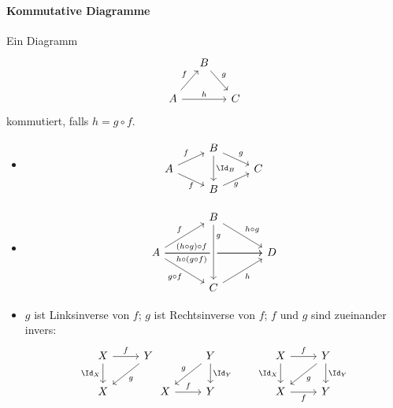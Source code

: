 \paragraph{Kommutative Diagramme}

Ein Diagramm
\[
	\begin{tikzcd}[column sep=small]
		& B \arrow{dr}{g} & \\
		A \arrow{ur}{f} \arrow{rr}{h} & & C
	\end{tikzcd}
\]
kommutiert, falls $h = g \circ f$.

\begin{ex}
	\begin{itemize}
		\item
			\[
				\begin{tikzcd}[row sep=tiny]
					& B \arrow{dr}{g} \arrow{dd}{\Id_B} & \\
					A \arrow{ur}{f} \arrow{dr}[below]{f} & & C \\
					& B \arrow{ur}[below]{g} &
				\end{tikzcd}
			\]
		\item
			\[
				\begin{tikzcd}[column sep=large]
					~& B \arrow{dr}{h\circ g} & \\
					A \arrow{ur}{f} \arrow{rr}[xshift=-7mm]{(h\circ g) \circ f}\arrow{rr}[xshift=-7mm,swap]{h\circ (g \circ f)} \arrow{dr}[swap]{g\circ f} & & D \\
					& C \arrow[leftarrow,crossing over]{uu}[yshift=5mm,swap]{g} \arrow{ur}[swap]{h} &
				\end{tikzcd}
			\]
		\item
			$g$ ist Linksinverse von $f$; $g$ ist Rechtsinverse von $f$; $f$ und $g$ sind zueinander invers:
			\[
				\begin{tikzcd}
					X \arrow{d}[swap]{\Id_X} \arrow{r}{f} & Y \arrow{dl}{g} \\
					X &
				\end{tikzcd}
				\!
				\begin{tikzcd}
					~& Y \arrow{d}{\Id_Y} \arrow{dl}[swap]{g} \\
					X \arrow{r}{f} & Y
				\end{tikzcd}
				\qquad
				\begin{tikzcd}
					X \arrow{r}{f} \arrow{d}[left]{\Id_X} & Y \arrow{d}{\Id_Y} \arrow{dl}{g} \\
					X \arrow{r}[below]{f} & Y
				\end{tikzcd}
			\]
	\end{itemize}
\end{ex}

